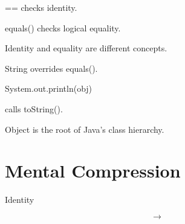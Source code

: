 \documentclass[11pt,a4paper]{book}
\begin{document}
\begin{rosettarule}

== checks identity.

\end{rosettarule}


\begin{rosettarule}

equals() checks logical equality.

\end{rosettarule}


\begin{rosettarule}

Identity and equality
are different concepts.

\end{rosettarule}


\begin{rosettarule}

String overrides equals().

\end{rosettarule}


\begin{rosettarule}

System.out.println(obj)

calls toString().

\end{rosettarule}


\begin{rosettarule}

Object is the root of Java's
class hierarchy.

\end{rosettarule}


\section{Mental Compression}

Identity

\[
\rightarrow
\]
\end{document}
